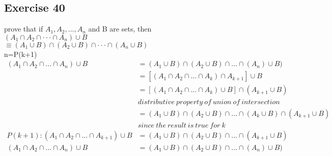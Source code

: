 \documentclass[12pt]{article}
\begin{document}
\subsection*{Exercise 40}
prove that if $A_1,A_2,...,A_n$ and B are sets, then\\
$(A_1\cap A_2 \cap \cdot \cdot \cdot \cap A_n)\cup B$\\
$\equiv (A_1\cup B)\cap (A_2\cup B)\cap \cdot \cdot \cdot \cap (A_n\cup B)$\\
n=P(k+1)\\
\begin{equation}\nonumber
    \begin{split}
       (A_1\cap  A_2\cap ...\cap A_n)\cup B&=(A_1\cup B)\cap (A_2\cup B)\cap ...\cap (A_n)\cup B)\\
        &=[(A_1\cap A_2\cap ...\cap A_k)\cap A_{k+1}]\cup B\\
        &=[(A_1\cap A_2\cap ...\cap A_k)\cup B]\cap (A_{k+1}\cup B)\\
        &distributive~property~of~union~of~intersection\\
        &=(A_1\cup B)\cap (A_2\cup B)\cap ...\cap (A_k\cup B)\cap (A_{k+1}\cup B)\\
        &since~ the~ result~ is~ true~ for ~k\\
        P(k+1):(A_1\cap A_2\cap ...\cap A_{k+1})\cup B&=(A_1\cup B)\cap (A_2\cup B)\cap ...\cap (A_{k+1}\cup B)\\
        (A_1\cap  A_2\cap ...\cap A_n)\cup B&=(A_1\cup B)\cap (A_2\cup B)\cap ...\cap (A_n)\cup B)\\
    \end{split}
\end{equation}
\end{document}
